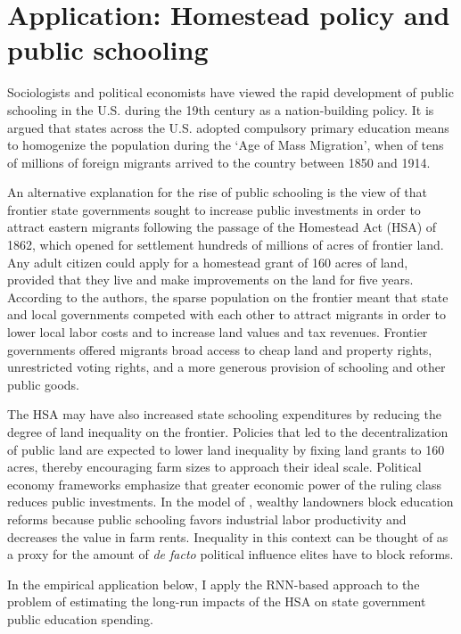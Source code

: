 \section{Application: Homestead policy and public schooling} \label{schooling-app}

Sociologists and political economists \citep[e.g,][]{meyer1979public,alesina2013nation,bandiera2018nation} have viewed the rapid development of public schooling in the U.S. during the 19th century as a nation-building policy. It is argued that states across the U.S. adopted compulsory primary education means to homogenize the population during the `Age of Mass Migration', when of tens of millions of foreign migrants arrived to the country between 1850 and 1914. 

An alternative explanation for the rise of public schooling is the view of \citet{engerman2005evolution} that frontier state governments sought to increase public investments in order to attract eastern migrants following the passage of the Homestead Act (HSA) of 1862, which opened for settlement hundreds of millions of acres of frontier land. Any adult citizen could apply for a homestead grant of 160 acres of land, provided that they live and make improvements on the land for five years.  According to the authors, the sparse population on the frontier meant that state and local governments competed with each other to attract migrants in order to lower local labor costs and to increase land values and tax revenues. Frontier governments offered migrants broad access to cheap land and property rights, unrestricted voting rights, and a more generous provision of schooling and other public goods.

The HSA may have also increased state schooling expenditures by reducing the degree of land inequality on the frontier. Policies that led to the decentralization of public land are expected to lower land inequality by fixing land grants to 160 acres, thereby encouraging farm sizes to approach their ideal scale. Political economy frameworks \citep[e.g.,][]{acemoglu2008persistence, besley2009origins} emphasize that greater economic power of the ruling class reduces public investments. In the model of \citet{galor2009inequality}, wealthy landowners block education reforms because public schooling favors industrial labor productivity and decreases the value in farm rents. Inequality in this context can be thought of as a proxy for the amount of \emph{de facto} political influence elites have to block reforms.

In the empirical application below, I apply the RNN-based approach to the problem of estimating the long-run impacts of the HSA on state government public education spending. 

